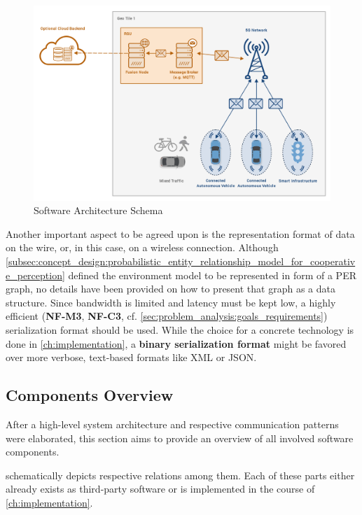 \begin{figure}
	\centering
	\includegraphics[width=1\linewidth]{98_images/architecture}
	\caption{Software Architecture Schema}
	\label{fig:architecture}
\end{figure}

\par
\bigskip

Another important aspect to be agreed upon is the representation format of data on the wire, or, in this case, on a wireless connection. Although \cref{subsec:concept_design:probabilistic_entity_relationship_model_for_cooperative_perception} defined the environment model to be represented in form of a PER graph, no details have been provided on how to present that graph as a data structure. Since bandwidth is limited and latency must be kept low, a highly efficient (\textbf{NF-M3}, \textbf{NF-C3}, cf. \cref{sec:problem_analysis:goals_requirements}) serialization format should be used. While the choice for a concrete technology is done in \cref{ch:implementation}, a \textbf{binary serialization format} might be favored over more verbose, text-based formats like XML or JSON.


\subsection{Components Overview}
\label{subsec:concept_design:components_overview}
After a high-level system architecture and respective communication patterns were elaborated, this section aims to provide an overview of all involved software components.

 schematically depicts respective relations among them. Each of these parts either already exists as third-party software or is implemented in the course of \cref{ch:implementation}.

